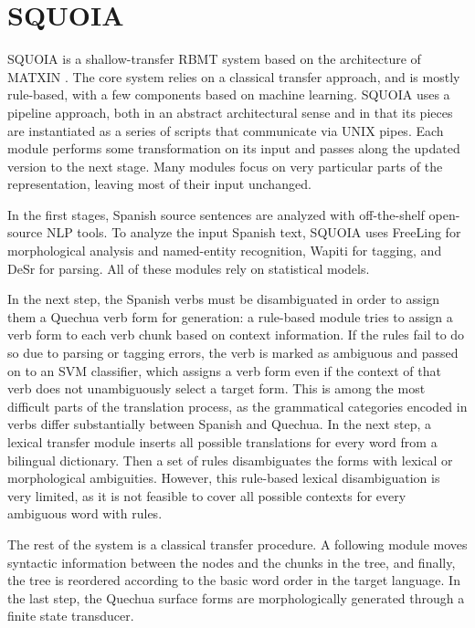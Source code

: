 \documentclass[10pt, a4paper]{article}
\begin{document}
\section{SQUOIA}
SQUOIA is a shallow-transfer RBMT system based on the
architecture of MATXIN \cite{matxin_2005,matxin}.
The core system relies on a classical transfer approach, and is mostly
rule-based, with a few components based on machine learning.
SQUOIA uses a pipeline approach, both in an abstract architectural sense and in
that its pieces are instantiated as a series of scripts that communicate
via UNIX pipes. Each module performs some transformation on its input and
passes along the updated version to the next stage. Many modules focus on very
particular parts of the representation, leaving most of their input unchanged.

In the first stages, Spanish source sentences are analyzed with off-the-shelf
open-source NLP tools. To analyze the input Spanish text,
SQUOIA uses FreeLing \cite{padro12} for morphological analysis and named-entity
recognition,
Wapiti \cite{lavergne2010practical} for tagging,
and DeSr \cite{attardi-EtAl:2007:EMNLP-CoNLL2007} for parsing.
All of these modules rely on statistical models.

In the next step, the Spanish verbs must be disambiguated in order to assign
them a Quechua verb form for generation: a rule-based module tries to assign a
verb form to each verb chunk based on context information. If the rules fail to
do so due to parsing or tagging errors, the verb is marked as ambiguous and
passed on to an SVM classifier, which assigns a verb form even if the context
of that verb does not unambiguously select a target form. This is among the
most difficult parts of the
translation process, as the grammatical categories encoded in verbs differ
substantially between Spanish and Quechua. In the next step, a lexical transfer
module inserts all possible translations for every word from a bilingual dictionary.
Then a set of rules disambiguates the forms with lexical or morphological
ambiguities. However, this rule-based lexical disambiguation is very limited,
as it is not feasible to cover all possible contexts for every ambiguous word
with rules.

The rest of the system is a classical transfer procedure. A following module
moves syntactic information between the nodes and the chunks in the tree, and
finally, the tree is reordered according to the basic word order in the target
language. In the last step, the Quechua surface forms are morphologically
generated through a finite state transducer.
\end{document}
